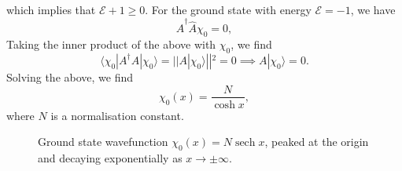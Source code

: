 which implies that $\mathcal{E}+1\geq0$.
For the ground state with energy $\mathcal{E}=-1$, we have
\begin{equation}
    \hat{A}^\dagger \hat{A}\chi_0 = 0,
\end{equation}
Taking the inner product of the above with $\chi_0$, we find 
\begin{equation}
    \langle \chi_0|A^\dagger A|\chi_0\rangle  = ||A|\chi_0\rangle||^2 = 0 \implies A|\chi_0\rangle=0.
\end{equation}
Solving the above, we find
\begin{equation}
    \chi_0(x) = \frac{N}{\cosh x},
\end{equation}
where $N$ is a normalisation constant.
\begin{figure}[htbp]
\centering
{}
\caption{Ground state wavefunction $\chi_0(x) = N\operatorname{sech}x$,
peaked at the origin and decaying exponentially as $x\to\pm\infty$.}
\label{fig:chi0}
\end{figure}
\flushbottom
